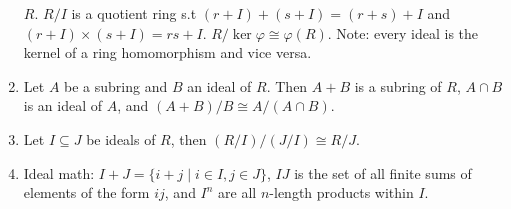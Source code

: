 \documentclass{article}
\begin{document}
\begin{enumerate}[1.]
        $R$. $R/I$ is a quotient ring s.t $(r+I)+(s+I) = (r+s)+I$ and
        $(r+I)\times(s+I) = rs + I$. $R/\ker \varphi \cong \varphi(R)$.
        Note: every ideal is the kernel of a ring homomorphism and vice
        versa.
    \item Let $A$ be a subring and $B$ an ideal of $R$. Then $A + B$ is a
        subring of $R$, $A \cap B$ is an ideal of $A$, and $(A+B)/B \cong
        A/(A \cap B)$.
    \item Let $I \subseteq J$ be ideals of $R$, then $(R/I)/(J/I) \cong
        R/J$.
    \item Ideal math: $I+J = \{i+j \mid i \in I, j \in J\}$, $IJ$ is the set
        of all finite sums of elements of the form $ij$, and $I^n$ are all
        $n$-length products within $I$.
\end{enumerate}
\end{document}
